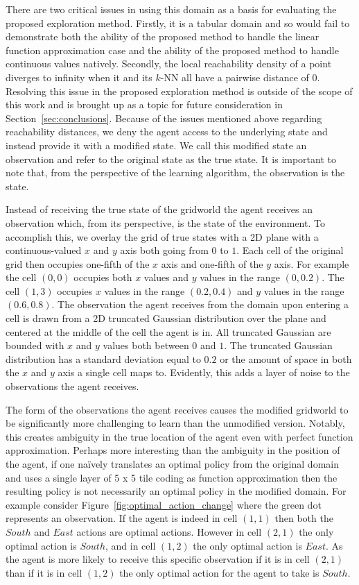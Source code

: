 \documentclass[../main.tex]{subfiles}
\begin{document}
There are two critical issues in using this domain as a basis for evaluating the proposed exploration method. Firstly, it is a tabular domain and so would fail to demonstrate both the ability of the proposed method to handle the linear function approximation case and the ability of the proposed method to handle continuous values natively. Secondly, the local reachability density of a point diverges to infinity when it and its $k$-NN all have a pairwise distance of $0$.  Resolving this issue in the proposed exploration method is outside of the scope of this work and is brought up as a topic for future consideration in Section~\ref{sec:conclusions}. Because of the issues mentioned above regarding reachability distances, we deny the agent access to the underlying state and instead provide it with a modified state. We call this modified state an observation and refer to the original state as the true state. It is important to note that, from the perspective of the learning algorithm, the observation is the state.

Instead of receiving the true state of the gridworld the agent receives an observation which, from its perspective, is the state of the environment. To accomplish this, we overlay the grid of true states with a 2D plane with a continuous-valued $x$ and $y$ axis both going from $0$ to $1$. Each cell of the original grid then occupies one-fifth of the $x$ axis and one-fifth of the $y$ axis. For example the cell $(0, 0)$ occupies both $x$ values and $y$ values in the range $(0, 0.2)$. The cell $(1, 3)$ occupies $x$ values in the range $(0.2, 0.4)$ and $y$ values in the range $(0.6, 0.8)$. The observation the agent receives from the domain upon entering a cell is drawn from a 2D truncated Gaussian distribution over the plane and centered at the middle of the cell the agent is in. All truncated Gaussian are bounded with $x$ and $y$ values both between $0$ and $1$. The truncated Gaussian distribution has a standard deviation equal to $0.2$ or the amount of space in both the $x$ and $y$ axis a single cell maps to. Evidently, this adds a layer of noise to the observations the agent receives.

The form of the observations the agent receives causes the modified gridworld to be significantly more challenging to learn than the unmodified version. Notably, this creates ambiguity in the true location of the agent even with perfect function approximation. Perhaps more interesting than the ambiguity in the position of the agent, if one na\"ively translates an optimal policy from the original domain and uses a single layer of 5 x 5 tile coding as function approximation then the resulting policy is not necessarily an optimal policy in the modified domain. For example consider Figure~\ref{fig:optimal_action_change} where the green dot represents an observation. If the agent is indeed in cell $(1, 1)$ then both the $South$ and $East$ actions are optimal actions. However in cell $(2, 1)$ the only optimal action is $South$, and in cell $(1, 2)$ the only optimal action is $East$. As the agent is more likely to receive this specific observation if it is in cell $(2, 1)$ than if it is in cell $(1, 2)$ the only optimal action for the agent to take is $South$.
\end{document}
